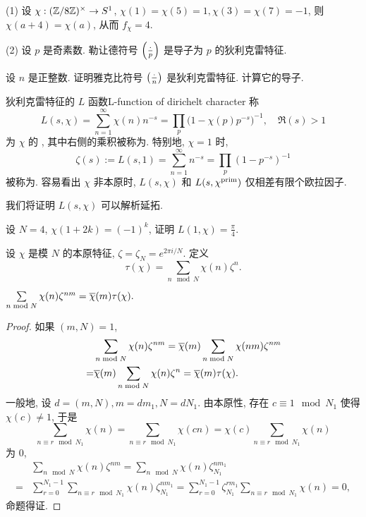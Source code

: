 \begin{example}
(1) 设 $\chi:({\mathbb{Z}}/8{\mathbb{Z}})^\times\to S^1$, $\chi(1)=\chi(5)=1,\chi(3)=\chi(7)=-1$, 则 $\chi(a+4)=\chi(a)$, 从而 $f_\chi=4$.

(2) 设 $p$ 是奇素数. 勒让德符号 $\left(\frac{{\cdot}}{p}\right)$ 是导子为 $p$ 的狄利克雷特征.
\end{example}
\begin{exercise}
设 $n$ 是正整数. 证明雅克比符号 $\left(\frac{{\cdot}}{n}\right)$ 是狄利克雷特征. 计算它的导子.
\end{exercise}


\begin{definition}{狄利克雷特征的 $L$ 函数}{L-function of dirichelt character}
称
  \[L(s,\chi)=\sum_{n=1}^\infty \chi(n)n^{-s}=\prod_p\bigl(1-\chi(p)p^{-s}\bigr)^{-1},\quad \Re(s)>1\]
为 $\chi$ 的 , 其中右侧的乘积被称为.
特别地, $\chi=1$ 时,
  \[\zeta(s):=L(s,1)=\sum_{n=1}^\infty n^{-s}=\prod_p(1-p^{-s})^{-1}\]
被称为. 容易看出 $\chi$ 非本原时, $L(s,\chi)$ 和 $L(s,\chi^{\mathrm{prim}})$ 仅相差有限个欧拉因子.
\end{definition}

我们将证明 $L(s,\chi)$ 可以解析延拓.

\begin{exercise}
设 $N=4$, $\chi(1+2k)=(-1)^k$, 证明 $L(1,\chi)=\frac{\pi}{4}.$
\end{exercise}

设 $\chi$ 是模 $N$ 的本原特征, $\zeta=\zeta_N=e^{2\pi i/N}$. 定义
\begin{equation}
\tau(\chi)=\sum_{n\mod N}\chi(n)\zeta^n.
\end{equation}

\begin{lemma}{}{}
$\sum\limits_{n\bmod N}\chi(n)\zeta^{nm}=\overline\chi(m)\tau(\chi).$
\end{lemma}
\begin{proof}
如果 $(m,N)=1$,
  \[\begin{split}
    &\sum_{n\bmod N}\chi(n)\zeta^{nm}=\overline\chi(m)\sum_{n\bmod N}\chi(nm)\zeta^{nm}\\
   =&\overline\chi(m)\sum_{n\bmod N}\chi(n)\zeta^n=\overline\chi(m)\tau(\chi).
  \end{split}\]
一般地, 设 $d=(m,N), m=dm_1, N=dN_1$. 由本原性, 存在 $c\equiv1\mod N_1$ 使得 $\chi(c)\neq1$, 于是
  \[\sum_{n\equiv r\mod N_1}\chi(n)=\sum_{n\equiv r\mod N_1}\chi(c n)=\chi(c)\sum_{n\equiv r\mod N_1}\chi(n)\]
为 $0$, 
  \[\begin{split}
    &\sum_{n\mod N}\chi(n)\zeta^{nm}=\sum_{n\mod N}\chi(n)\zeta_{N_1}^{nm_1}\\
   =&\sum_{r=0}^{N_1-1}\sum_{n\equiv r\mod N_1}\chi(n)\zeta_{N_1}^{nm_1}
     =\sum_{r=0}^{N_1-1}\zeta_{N_1}^{rm_1}\sum_{n\equiv r\mod N_1}\chi(n)=0,
  \end{split}\]
命题得证.
\end{proof}

